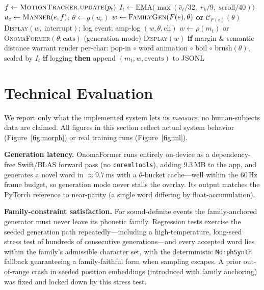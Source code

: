 \documentclass[sigconf,nonacm]{acmart}
\begin{document}
\begin{algorithm}[t]
\caption{Per-frame pipeline (60\,Hz)}
\label{alg:tick}
\begin{algorithmic}[1]
\State $f \gets \textsc{MotionTracker.update}(p_t)$ 
\State $I_t \gets \mathrm{EMA}\bigl(\max(\bar v_t/32,\; r_k/9,\; \mathrm{scroll}/40)\bigr)$ 
    \State $u_e \gets \textsc{Manner}(e, f)$;\; $\theta \gets g(u_e)$
    \State $w \gets \textsc{FamilyGen}(F(e), \theta)$ \textbf{or} $\mathcal{C}_{F(e)}(\theta)$ 
    \State \textsc{Display}$(w,\ \mathrm{interrupt})$;\; log event;\; amp-log $(w,\theta,\mathrm{ch})$
\EndFor
{} 
    \State $w \gets \rho(m_t)$ or \textsc{OnomaFormer}$(\theta,\mathrm{cats})$ (generation mode)
    \State \textsc{Display}$(w)$ \textbf{if} margin \& semantic distance warrant 
\EndIf
\State render per-char: pop-in $\circ$ word animation $\circ$ boil $\circ$ brush$(\theta)$, scaled by $I_t$
\State \textbf{if} logging \textbf{then} append $(m_t, w, \mathrm{events})$ to JSONL
\end{algorithmic}
\end{algorithm}

\section{Technical Evaluation}
\label{sec:eval}

We report only what the implemented system lets us \emph{measure}; no human-subjects data are claimed. All figures in this section reflect actual system behavior (Figure~\ref{fig:morph}) or real training runs (Figure~\ref{fig:ml}).

\textbf{Generation latency.} OnomaFormer runs entirely on-device as a dependency-free Swift/BLAS forward pass (no \texttt{coremltools}), adding 9.3\,MB to the app, and generates a novel word in ${\approx}9.7$\,ms with a $\theta$-bucket cache---well within the 60\,Hz frame budget, so generation mode never stalls the overlay. Its output matches the PyTorch reference to near-parity (a single word differing by float-accumulation).

\textbf{Family-constraint satisfaction.} For sound-definite events the family-anchored generator must never leave its phonetic family. Regression tests exercise the seeded generation path repeatedly---including a high-temperature, long-seed stress test of hundreds of consecutive generations---and every accepted word lies within the family's admissible character set, with the deterministic \texttt{MorphSynth} fallback guaranteeing a family-faithful form when sampling escapes. A prior out-of-range crash in seeded position embeddings (introduced with family anchoring) was fixed and locked down by this stress test.
\end{document}
